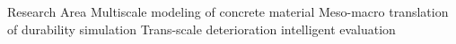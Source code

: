 
\begin{rubric}{Research Area}
\entry*[ ]
	Multiscale modeling of concrete material
\entry*[ ]
	Meso-macro translation of durability simulation
\entry*[ ]
	Trans-scale deterioration intelligent evaluation
\end{rubric}
